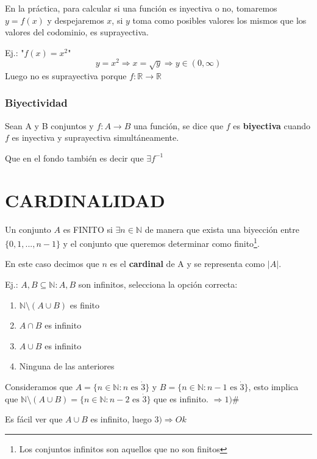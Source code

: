 \documentclass[10pt,a4paper,openright]{book}
\begin{document}
En la práctica, para calcular si una función es inyectiva o no, tomaremos $y=f(x)$ y despejaremos $x$, si $y$ toma como posibles valores los mismos que los valores del codominio, es suprayectiva.\par

Ej.:  "$f(x)=x^2$"
$$y=x^2\Rightarrow x=\sqrt{y}\Rightarrow y\in (0,\infty)$$
Luego no es suprayectiva porque $f: \mathbb R \rightarrow \mathbb R$

\subsubsection*{Biyectividad}
Sean A y B conjuntos y $f: A \rightarrow B$ una función, se dice que $f$ es \textbf{biyectiva} cuando $f$ es inyectiva y suprayectiva simultáneamente.\par
Que en el fondo también es decir que $\exists f^{-1}$

\section*{CARDINALIDAD}
Un conjunto $A$ es FINITO si $\exists n\in \mathbb N$ de manera que exista  una biyección entre $\{0,1,...,n-1\}$ y el conjunto que queremos determinar como finito\footnote{Los conjuntos infinitos son aquellos que no son finitos}.\par
En este caso decimos que $n$ es el \textbf{cardinal} de A y se representa como $|A|$.

Ej.: $A,B\subseteq \mathbb N: A,B$ son infinitos, selecciona la opción correcta:
\begin{enumerate}
\item $\mathbb N\mbox{\textbackslash}(A\cup B)$ es finito
\item $A\cap B$ es infinito
\item $A\cup B$ es infinito
\item Ninguna de las anteriores
\end{enumerate}

Consideramos que $A=\{n\in \mathbb N: n\mbox{ es }\dot{3}\}$ y $B=\{n\in \mathbb N: n-1\mbox{ es }\dot{3}\}$, esto implica que $\mathbb N\mbox{\textbackslash}(A\cup B)=\{n\in \mathbb N: n-2\mbox{ es }\dot{3}\}$ que es infinito. $\Rightarrow 1)\#$

Es fácil ver que $A\cup B$ es infinito, luego $3)\Rightarrow Ok$
\end{document}
